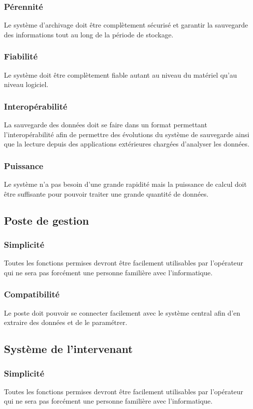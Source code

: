 \documentclass[a4paper, 11pt]{article}
\begin{document}
	\subsubsection{Pérennité}
	 Le système d'archivage doit être complètement sécurisé et garantir la sauvegarde des informations tout au long de la période de stockage.
	\subsubsection{Fiabilité}
	Le système doit être complètement fiable autant au niveau du matériel qu'au niveau logiciel.
	\subsubsection{Interopérabilité}
	La sauvegarde des données doit se faire dans un format permettant l'interopérabilité afin de permettre des évolutions du système de sauvegarde ainsi que la lecture depuis des applications extérieures chargées d'analyser les données.
	\subsubsection{Puissance}
	Le système n'a pas besoin d'une grande rapidité mais la puissance de calcul doit être suffisante pour pouvoir traiter une grande quantité de données.
	
\subsection{Poste de gestion}
	\subsubsection{Simplicité}
	Toutes les fonctions permises devront être facilement utilisables par l'opérateur qui ne sera pas forcément une personne familière avec l'informatique.
	\subsubsection{Compatibilité}
	Le poste doit pouvoir se connecter facilement avec le système central afin d'en extraire des données et de le paramétrer.
		
\subsection{Système de l'intervenant}
	\subsubsection{Simplicité}
	Toutes les fonctions permises devront être facilement utilisables par l'opérateur qui ne sera pas forcément une personne familière avec l'informatique.
\end{document}

